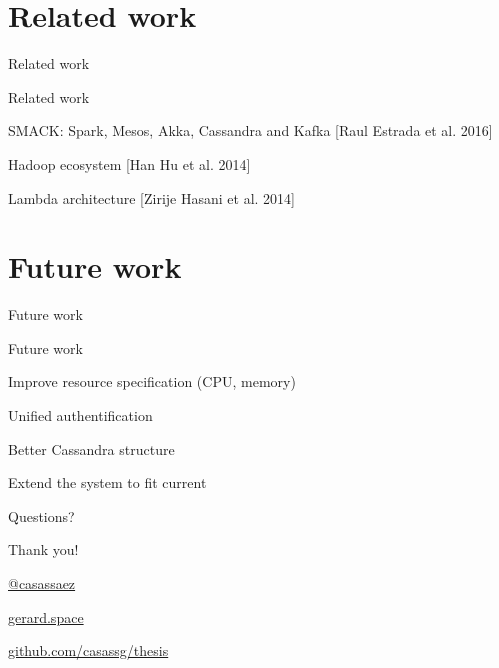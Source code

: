 \documentclass{beamer}
\newenvironment{wideitemize}{\itemize\addtolength{\itemsep}{20pt}}{\enditemize}
\newcommand{\hugeframedouble}[2]{
\begin{frame}[c]
  \begin{center}
    \huge\textcolor{title}{#1}
    \vfill

    \normalsize #2

  \end{center}

\end{frame}
}
\newcommand{\hugeframe}[1]{
\begin{frame}[c]
  \begin{center}
    \huge\textcolor{title}{#1}
  \end{center}

\end{frame}
}
\begin{document}
\section{Related work}
\hugeframe{Related work}

\begin{frame}{Related work}
\begin{wideitemize}
  \item SMACK: Spark, Mesos, Akka, Cassandra and Kafka [Raul Estrada et al. 2016]
  \item Hadoop ecosystem [Han Hu et al. 2014]
  \item Lambda architecture [Zirije Hasani et al. 2014]
\end{wideitemize}
\end{frame}

\section{Future work}
\hugeframe{Future work}

\begin{frame}{Future work}
\begin{wideitemize}
  \item Improve resource specification (CPU, memory)
  \item Unified authentification
  \item Better Cassandra structure
  \item Extend the system to fit current
\end{wideitemize}
\end{frame}

\hugeframe{Questions?}


\hugeframedouble{Thank you!}{
\begin{description}
  \addtolength{\itemsep}{5pt}
  \item[\textbf{Twitter}]  \href{http://twitter.com/casassaez}{@casassaez}
  \item[\textbf{Website}]  \href{http://gerard.space}{gerard.space}
  \item[\textbf{Repo}] \href{http://github.com/casassg/thesis}{github.com/casassg/thesis}

\end{description} 

}



\end{document}

